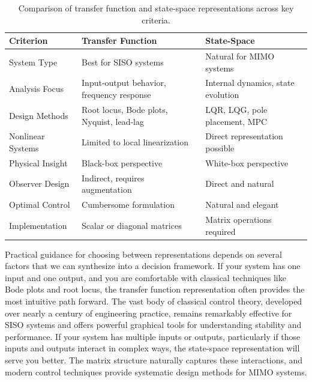 \begin{table}[h]
\centering
\begin{tabular}{|p{}|p{}|p{}|}
\hline
\textbf{Criterion} & \textbf{Transfer Function} & \textbf{State-Space} \\
\hline
System Type & Best for SISO systems & Natural for MIMO systems \\
\hline
Analysis Focus & Input-output behavior, frequency response & Internal dynamics, state evolution \\
\hline
Design Methods & Root locus, Bode plots, Nyquist, lead-lag & LQR, LQG, pole placement, MPC \\
\hline
Nonlinear Systems & Limited to local linearization & Direct representation possible \\
\hline
Physical Insight & Black-box perspective & White-box perspective \\
\hline
Observer Design & Indirect, requires augmentation & Direct and natural \\
\hline
Optimal Control & Cumbersome formulation & Natural and elegant \\
\hline
Implementation & Scalar or diagonal matrices & Matrix operations required \\
\hline
\end{tabular}
\caption{Comparison of transfer function and state-space representations across key criteria.}
\end{table}

Practical guidance for choosing between representations depends on several factors that we can synthesize into a decision framework. If your system has one input and one output, and you are comfortable with classical techniques like Bode plots and root locus, the transfer function representation often provides the most intuitive path forward. The vast body of classical control theory, developed over nearly a century of engineering practice, remains remarkably effective for SISO systems and offers powerful graphical tools for understanding stability and performance. If your system has multiple inputs or outputs, particularly if those inputs and outputs interact in complex ways, the state-space representation will serve you better. The matrix structure naturally captures these interactions, and modern control techniques provide systematic design methods for MIMO systems.

